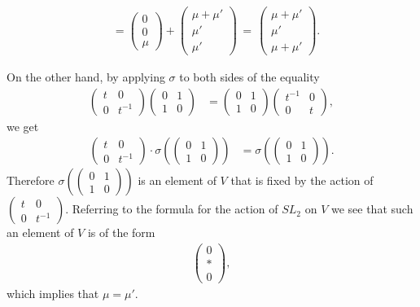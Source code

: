 \begin{align*}
	&=
\left(\begin{matrix} 0 \\ 0 \\ \mu \end{matrix}\right)
	+
	\left(\begin{matrix} \mu + \mu' \\ \mu' \\ \mu' \end{matrix}\right)
	\,=\,
	\left(\begin{matrix} \mu + \mu' \\ \mu' \\ \mu + \mu' \end{matrix}\right).
	\end{align*}

	On the other hand, by applying $\sigma$ to both sides of the equality
	\begin{align*}
\left(\begin{matrix} t & 0 \\ 0 & t^{-1} \end{matrix}\right)
	\left(\begin{matrix} 0 & 1 \\ 1 & 0 \end{matrix}\right) &=
\left(\begin{matrix} 0 & 1 \\ 1 & 0 \end{matrix}\right)
	\left(\begin{matrix} t^{-1} & 0 \\ 0 & t \end{matrix}\right),
	\end{align*} 
	we get
	\begin{align*}
	\left(\begin{matrix} t & 0 \\ 0 & t^{-1} \end{matrix}\right) \cdot
	\sigma\left(
			\left(\begin{matrix} 0 & 1 \\ 1 & 0 \end{matrix}\right)
			\right) &=
	\sigma\left(
			\left(\begin{matrix} 0 & 1 \\ 1 & 0 \end{matrix}\right)
			\right).
	\end{align*}
	Therefore $\sigma\left(
			\left(\begin{matrix} 0 & 1 \\ 1 & 0 \end{matrix}\right)
			\right)$ is an element of $V$ that is fixed by the action of $\left(\begin{matrix} t & 0 \\ 0 & t^{-1} \end{matrix}\right)$. Referring to the formula for the action of $SL_2$ on $V$ we see that such an element of $V$ is of the form
	\begin{align*}
	\left(\begin{matrix} 0 \\ * \\ 0 \end{matrix}\right),
	\end{align*}
	which implies that $\mu = \mu'$.

